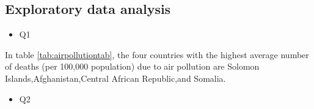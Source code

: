 \documentclass[11pt,a4paper,]{article}
\providecommand{\tightlist}{%
  \setlength{\itemsep}{0pt}\setlength{\parskip}{0pt}}
\begin{document}
\hypertarget{exploratory-data-analysis}{%
\subsection{Exploratory data analysis}\label{exploratory-data-analysis}}

\begin{itemize}
\tightlist
\item
  Q1
\end{itemize}

\begin{table}[!h]

\caption{\label{tab:airpollutiontab}Average number of deaths from air pollution, 1990 to 2019}
\centering
{}
\end{table}

In table \ref{tab:airpollutiontab}, the four countries with the highest average number of deaths (per 100,000 population) due to air pollution are Solomon Islands,Afghanistan,Central African Republic,and Somalia.

\begin{itemize}
\tightlist
\item
  Q2
\end{itemize}
\end{document}
